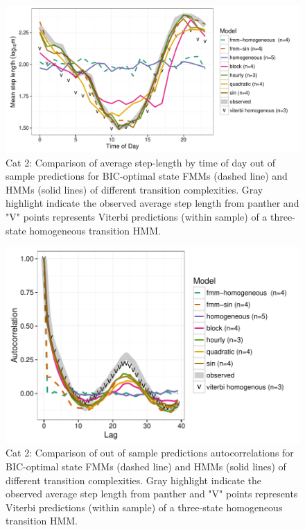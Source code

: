 \documentclass{article}\usepackage[]{graphicx}\usepackage{xcolor}
\makeatletter
\def\maxwidth{ %
  \ifdim\Gin@nat@width>\linewidth
    \linewidth
  \else
    \Gin@nat@width
  \fi
}
\newenvironment{knitrout}{}{} %
\makeatother
\begin{document}
\clearpage

\begin{knitrout}
\color{fgcolor}\begin{figure}
\includegraphics[width=\maxwidth]{figure/avg_step_length_by_time2-1} \caption{Cat 2: Comparison of average step-length by time of day out of sample predictions for BIC-optimal state FMMs (dashed line) and HMMs (solid lines) of different transition complexities. Gray highlight indicate the observed average step length from panther and "V" points represents Viterbi predictions (within sample) of a three-state homogeneous transition HMM.}\label{fig:avg_step_length_by_time2}
\end{figure}


\end{knitrout}

\clearpage

\begin{knitrout}
\color{fgcolor}\begin{figure}
\includegraphics[width=\maxwidth]{figure/acf_plot2-1} \caption{Cat 2: Comparison of out of sample predictions autocorrelations for BIC-optimal state FMMs (dashed line) and HMMs (solid lines) of different transition complexities. Gray highlight indicate the observed average step length from panther and "V" points represents Viterbi predictions (within sample) of a three-state homogeneous transition HMM.}
\end{figure}


\end{knitrout}
\end{document}
